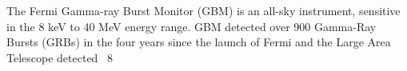 


\bigskip



\bigskip

\noindent The Fermi Gamma-ray Burst Monitor (GBM) is an all-sky instrument, sensitive in the 8 keV to 40 MeV energy range. GBM  detected over 900 Gamma-Ray Bursts (GRBs) in the four years since the launch of Fermi and the Large Area Telescope detected ~8%
